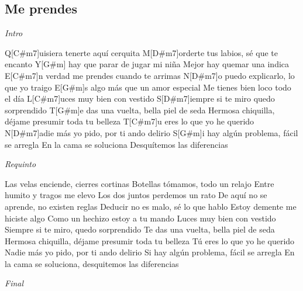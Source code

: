\subsection{Me prendes}
\noindent

\vspace{1cm}

\begin{guitar}
	\begin{multicols}{2}
		\par
		\textit{Intro}

		Q[C#m7]uisiera tenerte aquí cerquita
		M[D#m7]orderte tus labios, sé que te encanto
		Y[G#m] hay que parar de jugar mi niña
		Mejor hay quemar una indica
		E[C#m7]n verdad me prendes cuando te arrimas
		N[D#m7]o puedo explicarlo, lo que yo traigo
		E[G#m]s algo más que un amor especial
		Me tienes bien loco todo el día
		L[C#m7]uces muy bien con vestido
		S[D#m7]iempre si te miro quedo sorprendido
		T[G#m]e das una vuelta, bella piel de seda
		Hermosa chiquilla, déjame presumir toda tu belleza
		T[C#m7]u eres lo que yo he querido
		N[D#m7]adie más yo pido, por ti ando delirio
		S[G#m]i hay algún problema, fácil se arregla
		En la cama se soluciona
		Desquítemos las diferencias
		\par
		\textit{Requinto}
		\par
		Las velas enciende, cierres cortinas
		Botellas tómamos, todo un relajo
		Entre humito y tragos me elevo
		Los dos juntos perdemos un rato
		De aquí no se aprende, no existen reglas
		Deducir no es malo, sé lo que hablo
		Estoy demente me hiciste algo
		Como un hechizo estoy a tu mando
		Luces muy bien con vestido
		Siempre si te miro, quedo sorprendido
		Te das una vuelta, bella piel de seda
		Hermosa chiquilla, déjame presumir toda tu belleza
		Tú eres lo que yo he querido
		Nadie más yo pido, por ti ando delirio
		Si hay algún problema, fácil se arregla
		En la cama se soluciona, desquitemos las diferencias

\par
\textit{Final}
	\end{multicols}
\end{guitar}
